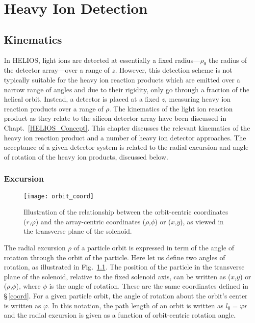 \chapter{Heavy Ion Detection}
\section{Kinematics}
In HELIOS, light ions are detected at essentially a fixed radius---$\rho_0$ the radius of the detector array---over a range of $z$.  However, this detection scheme is not typically suitable for the heavy ion reaction products which are emitted over a narrow range of angles and due to their rigidity, only go through a fraction of the helical orbit.  Instead, a detector is placed at a fixed $z$, measuring heavy ion reaction products over a range of $\rho$.  The kinematics of the light ion reaction product as they relate to the silicon detector array have been discussed in Chapt.~\ref{HELIOS_Concept}.  This chapter discusses the relevant kinematics of the heavy ion reaction product and a number of heavy ion detector approaches.  The acceptance of a given detector system is related to the radial excursion and angle of rotation of the heavy ion products, discussed below.
\subsection{Excursion}

\begin{figure}%
\centering
\texttt{[image: orbit\_coord]}%
\caption[Illustration of the relationship between orbit-centric and array-centric coordinates]{Illustration of the relationship between the orbit-centric coordinates ($r$,$\varphi$) and the array-centric coordinates ($\rho$,$\phi$) or ($x$,$y$), as viewed in the transverse plane of the solenoid.}%
\label{orbit_coord}%
\end{figure}

The radial excursion $\rho$ of a particle orbit is expressed in term of the angle of rotation through the orbit of the particle.  Here let us define two angles of rotation, as illustrated in Fig.~\ref{orbit_coord}.  The position of the particle %
in the transverse plane of the solenoid, relative to the fixed solenoid axis, can be written as ($x$,$y$) or ($\rho$,$\phi$), where $\phi$ is the angle of rotation.  These are the same coordinates defined in \S\,\ref{coord}.  For a given particle orbit, the angle of rotation about the orbit's center is written as $\varphi$.  In this notation, the path length of an orbit is written as $l_0=\varphi r$ and the radial excursion is given as a function of orbit-centric rotation angle.


